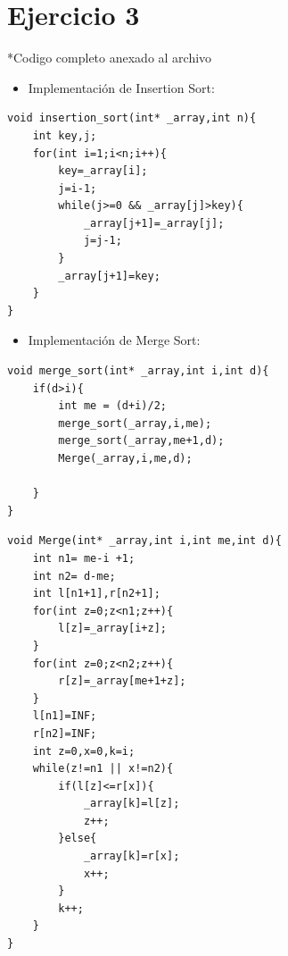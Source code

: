 \documentclass{article}
\begin{document}
\section{Ejercicio 3}
*Codigo completo anexado al archivo
\begin{itemize}
    \item Implementación de Insertion Sort:
\end{itemize}
\begin{lstlisting}
void insertion_sort(int* _array,int n){
    int key,j;
    for(int i=1;i<n;i++){
        key=_array[i];
        j=i-1;
        while(j>=0 && _array[j]>key){
            _array[j+1]=_array[j];
            j=j-1;
        }
        _array[j+1]=key;
    }
}
\end{lstlisting}

\begin{itemize}
    \item Implementación de Merge Sort:
\end{itemize}

\begin{lstlisting}
void merge_sort(int* _array,int i,int d){
    if(d>i){
        int me = (d+i)/2;
        merge_sort(_array,i,me);
        merge_sort(_array,me+1,d);
        Merge(_array,i,me,d);

    }
}
\end{lstlisting}

\begin{lstlisting}
void Merge(int* _array,int i,int me,int d){
    int n1= me-i +1;
    int n2= d-me;
    int l[n1+1],r[n2+1];
    for(int z=0;z<n1;z++){
        l[z]=_array[i+z];
    }
    for(int z=0;z<n2;z++){
        r[z]=_array[me+1+z];
    }
    l[n1]=INF;
    r[n2]=INF;
    int z=0,x=0,k=i;
    while(z!=n1 || x!=n2){
        if(l[z]<=r[x]){
            _array[k]=l[z];
            z++;
        }else{
            _array[k]=r[x];
            x++;
        }
        k++;
    }
}
\end{lstlisting}
\end{document}

